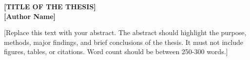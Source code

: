 \begin{center}
\textbf{\Large [TITLE OF THE THESIS]}\\[6pt]
\textbf{[Author Name]}\\[12pt]
\end{center}
[Replace this text with your abstract. The abstract should highlight the purpose, methods, major findings, and brief conclusions of the thesis. It must not include figures, tables, or citations. Word count should be between 250-300 words.]

\endinput